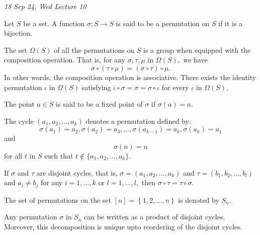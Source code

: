 \emph{18 Sep 24, Wed \hfill Lecture 10}

\begin{definition}[Permutation]
	Let $S$ be a set. A function $ \sigma \colon S \to S$ is said to be a
	permutation on $S$ if it is a bijection.
\end{definition}

The set $ \Omega (S) $ of all the permutations on $S$ is a group when equipped with the
composition operation.
That is, for any $\sigma, \tau, \mu$ in $ \Omega(S),$ we have
$$ \sigma \circ ( \tau \circ \mu) = (\sigma \circ \tau) \circ \mu.$$
In other words, the composition operation is associative.
There exists the identity permutation $ \iota $ in $ \Omega(S)$
satisfying $\iota \circ \sigma = \sigma = \sigma \circ \iota$
for every $\iota$ in $ \Omega(S).$

The point $a \in S$ is said to be a fixed point of $ \sigma $ if $ \sigma(a) = a.$

The cycle $(a_1, a_2, \dotsc, a_k)$ denotes a permutation defined by:
$$ \sigma(a_1) = a_2, \sigma(a_2) = a_3, \dotsc, \sigma(a _{k-1} ) = a_k, \sigma(a_k) = a_1$$
and 
$$ \sigma(n) = n$$
for all $t $ in $S$ such that $t \not \in \{a_1, a_2, \dotsc, a_k\}.$

If $\sigma$ and $ \tau$ are disjoint cycles, that is,
$ \sigma =  (a_1, a_2, \dotsc, a_k)$ and $\tau = (b_1, b_2, \dotsc, b_l) $
and $a_i \not = b_j$ for any $i = 1, \dotsc, k $ or $ l =1 ,\dotsc, l,$
then $ \sigma \circ \tau = \tau \circ \sigma.$

\begin{definition}[$S_n$]
	The set of permutations on the set $\left[ n \right] = \left\{ 1, 2, \dotsc, n \right\} $ is denoted by $S_n.$
\end{definition}

\begin{theorem}
	Any permutation $ \sigma $ in $S_n$ can be written as a product of disjoint cycles.
	Moreover, this decomposition is unique upto reordering of the disjoint cycles.
\end{theorem}


